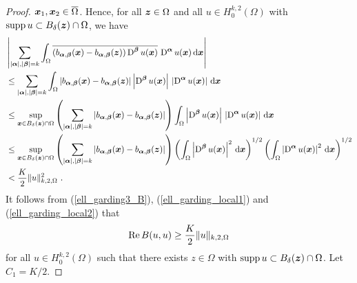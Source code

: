 \begin{proof}
${\bm{x}}_1, {\bm{x}}_2 \in \overline{\Omega}$.
Hence, for all ${\bm{z}} \in \Omega$ and all
$\displaystyle u \in H^{k,2}_0(\Omega)$ with
$\operatorname{supp} u \subset B_\delta({\bm{z}}) \cap \Omega$, we have
\begin{align}
&\left| \sum_{|{\bm{\alpha}}|,|{\bm{\beta}}|= k} \int_{\Omega}
\overline{\left(b_{{\bm{\alpha}},{\bm{\beta}}}({\bm{x}})
-b_{{\bm{\alpha}},{\bm{\beta}}}({\bm{z}})\right)
\operatorname{D}^{{\bm{\beta}}} u({\bm{x}})}\, \operatorname{D}^{{\bm{\alpha}}} u({\bm{x}})
\,\mathrm{d}{{\bm{x}}} \right|
\nonumber \\
& \leq \sum_{|{\bm{\alpha}}|,|{\bm{\beta}}|= k} \int_{\Omega}
\left|b_{{\bm{\alpha}},{\bm{\beta}}}({\bm{x}})
-b_{{\bm{\alpha}},{\bm{\beta}}}({\bm{z}})\right|
\left| \operatorname{D}^{{\bm{\beta}}} u({\bm{x}})\right|\,
\left| \operatorname{D}^{{\bm{\alpha}}} u({\bm{x}}) \right|\,\mathrm{d}{{\bm{x}}} \nonumber \\
& \leq \sup_{{\bm{x}}\in B_\delta({\bm{z}}) \cap \Omega}
\left( \sum_{|{\bm{\alpha}}|,|{\bm{\beta}}|= k}
\left|b_{{\bm{\alpha}},{\bm{\beta}}}({\bm{x}})
-b_{{\bm{\alpha}},{\bm{\beta}}}({\bm{z}})\right| \right)
\int_{\Omega} \left| \operatorname{D}^{{\bm{\beta}}} u({\bm{x}})\right|\,
\left| \operatorname{D}^{{\bm{\alpha}}} u({\bm{x}}) \right|\,\mathrm{d}{{\bm{x}}} \nonumber \\
& \leq \sup_{{\bm{x}}\in B_\delta({\bm{z}}) \cap \Omega}
\left( \sum_{|{\bm{\alpha}}|,|{\bm{\beta}}|= k}
\left|b_{{\bm{\alpha}},{\bm{\beta}}}({\bm{x}})
-b_{{\bm{\alpha}},{\bm{\beta}}}({\bm{z}})\right| \right)
\left( \int_{\Omega} \left| \operatorname{D}^{{\bm{\beta}}} u({\bm{x}})\right|^2 \,\mathrm{d}{{\bm{x}}}
\right)^{1/2}
\left( \int_{\Omega} \left| \operatorname{D}^{{\bm{\alpha}}} u({\bm{x}}) \right|^2 \,\mathrm{d}{{\bm{x}}}
\right)^{1/2} \nonumber \\
& < \frac{K}{2} \|u\|_{k,2,\Omega}^2 \ . \label{ell_garding_local2}
\end{align}
It follows from (\ref{ell_garding3_B}), (\ref{ell_garding_local1}) and
(\ref{ell_garding_local2}) that
\begin{equation} \label{ell_garding3_delta}
\operatorname{Re} B(u,u) \geq \frac{K}{2} \|u\|_{k,2,\Omega}
\end{equation}
for all $\displaystyle u \in H^{k,2}_0(\Omega)$ such that there
exists $z\in \Omega$ with $\operatorname{supp} u \subset B_{\delta}({\bm{z}}) \cap \Omega$.
Let $C_1=K/2$.


\end{proof}
